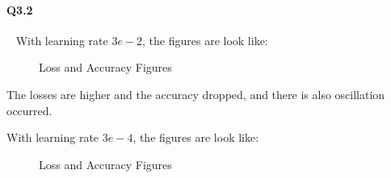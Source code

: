 \documentclass[11pt]{article} \usepackage{fullpage} \usepackage{graphicx} \usepackage{epstopdf} \usepackage{color} \usepackage{psfrag} \usepackage{pdfsync}\usepackage{indentfirst}\usepackage{subfigure}\usepackage{float}\usepackage[section]{placeins}
\begin{document}
\paragraph{Q3.2}~{}
With learning rate $3e-2$, the figures are look like:
\begin{figure}[H]
\centering
{}
\caption{Loss and Accuracy Figures}
\end{figure}

The losses are higher and the accuracy dropped, and there is also oscillation occurred.

With learning rate $3e-4$, the figures are look like:
\begin{figure}[H]
\centering
{}
\caption{Loss and Accuracy Figures}
\end{figure}
\end{document}
